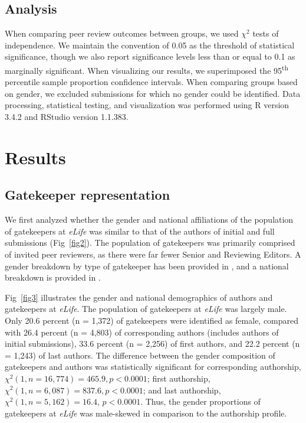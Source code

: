 \documentclass[10pt,letterpaper]{article}
\begin{document}
\subsection*{Analysis}
When comparing peer review outcomes between groups, we used $\chi^{2}$ tests of independence. We maintain the convention of 0.05 as the threshold of statistical significance, though we also report significance levels less than or equal to 0.1 as marginally significant. When visualizing our results, we superimposed the 95\textsuperscript{th} percentile sample proportion confidence intervals. When comparing groups based on gender, we excluded submissions for which no gender could be identified. Data processing, statistical testing, and visualization was performed using R version 3.4.2 and RStudio version 1.1.383. 

%
%
\section*{Results}

\subsection*{Gatekeeper representation}
We first analyzed whether the gender and national affiliations of the population of gatekeepers at \textit{eLife} was similar to that of the authors of initial and full submissions (Fig~\ref{fig2}). The population of gatekeepers was primarily comprised of invited peer reviewers, as there were far fewer Senior and Reviewing Editors. A gender breakdown by type of gatekeeper has been provided in , and a national breakdown is provided in .

Fig~\ref{fig3} illustrates the gender and national demographics of authors and gatekeepers at \textit{eLife}. The population of gatekeepers at \textit{eLife} was largely male. Only 20.6 percent (n = 1,372) of gatekeepers were identified as female, compared with 26.4 percent (n = 4,803) of corresponding authors (includes authors of initial submissions), 33.6 percent (n = 2,256) of first authors, and 22.2 percent (n = 1,243) of last authors. The difference between the gender composition of gatekeepers and authors was statistically significant for corresponding authorship, $\chi^{2} (1, n = 16,774) = 465.9, p < 0.0001$; first authorship, $\chi^{2} (1, n = 6,087) = 837.6, p < 0.0001$; and last authorship, $\chi^{2} (1, n = 5,162) = 16.4$, $p < 0.0001$. Thus, the gender proportions of gatekeepers at \textit{eLife} was male-skewed in comparison to the authorship profile. 
\end{document}
